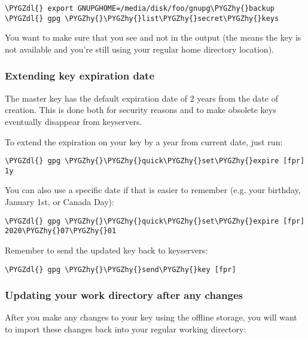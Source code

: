\documentclass[a4paper,8pt,english]{sphinxmanual}
\def\PYGZdl{\char`\$}
\def\PYGZhy{\char`\-}
\begin{document}
\begin{Verbatim}[commandchars=\\\{\}]
\PYGZdl{} export GNUPGHOME=/media/disk/foo/gnupg\PYGZhy{}backup
\PYGZdl{} gpg \PYGZhy{}\PYGZhy{}list\PYGZhy{}secret\PYGZhy{}keys
\end{Verbatim}

You want to make sure that you see  and not  in the
output (the \code{\#} means the key is not available and you're still using
your regular home directory location).


\subsubsection{Extending key expiration date}
\label{process/maintainer-pgp-guide:extending-key-expiration-date}
The master key has the default expiration date of 2 years from the date
of creation. This is done both for security reasons and to make obsolete
keys eventually disappear from keyservers.

To extend the expiration on your key by a year from current date, just
run:

\begin{Verbatim}[commandchars=\\\{\}]
\PYGZdl{} gpg \PYGZhy{}\PYGZhy{}quick\PYGZhy{}set\PYGZhy{}expire [fpr] 1y
\end{Verbatim}

You can also use a specific date if that is easier to remember (e.g.
your birthday, January 1st, or Canada Day):

\begin{Verbatim}[commandchars=\\\{\}]
\PYGZdl{} gpg \PYGZhy{}\PYGZhy{}quick\PYGZhy{}set\PYGZhy{}expire [fpr] 2020\PYGZhy{}07\PYGZhy{}01
\end{Verbatim}

Remember to send the updated key back to keyservers:

\begin{Verbatim}[commandchars=\\\{\}]
\PYGZdl{} gpg \PYGZhy{}\PYGZhy{}send\PYGZhy{}key [fpr]
\end{Verbatim}


\subsubsection{Updating your work directory after any changes}
\label{process/maintainer-pgp-guide:updating-your-work-directory-after-any-changes}
After you make any changes to your key using the offline storage, you will
want to import these changes back into your regular working directory:
\end{document}
